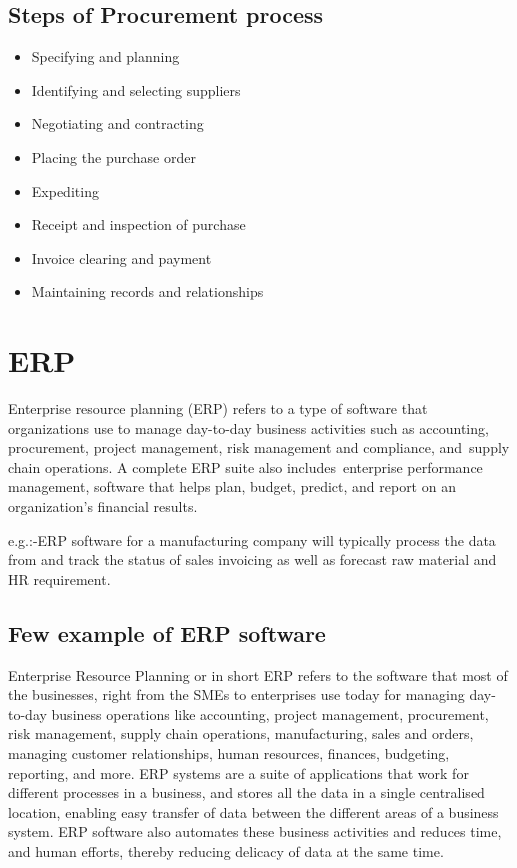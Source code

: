 \documentclass[twocolumn, 12pt, a4paper]{article}
\begin{document}
\subsection{Steps of Procurement process}
\begin{itemize}
  \item Specifying and planning
  \item Identifying and selecting suppliers
  \item Negotiating and contracting
  \item Placing the purchase order
  \item Expediting
  \item Receipt and inspection of purchase
  \item Invoice clearing and payment
  \item Maintaining records and relationships
\end{itemize}

\section{ERP}
Enterprise resource planning (ERP) refers to a type of software that organizations use to manage day-to-day business activities such as accounting, procurement, project management, risk management and compliance, and supply chain operations. A complete ERP suite also includes enterprise performance management, software that helps plan, budget, predict, and report on an organization’s financial results.

e.g.:-ERP software for a manufacturing company will typically process the data from and track the status of sales invoicing as well as forecast raw material and HR requirement.

\subsection{Few example of ERP software}
Enterprise Resource Planning or in short ERP refers to the software that most of the businesses, right from the SMEs to enterprises use today for managing day-to-day business operations like accounting, project management, procurement, risk management, supply chain operations, manufacturing, sales and orders, managing customer relationships, human resources, finances, budgeting, reporting, and more. ERP systems are a suite of applications that work for different processes in a business, and stores all the data in a single centralised location, enabling easy transfer of data between the different areas of a business system. ERP software also automates these business activities and reduces time, and human efforts, thereby reducing delicacy of data at the same time.
\end{document}
